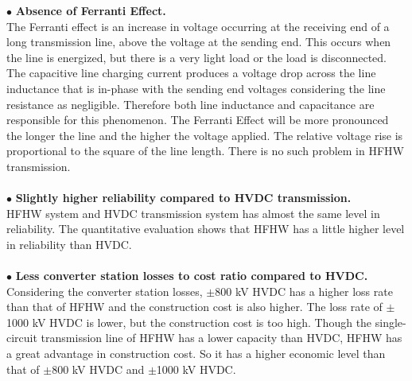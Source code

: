 \documentclass[12pt,a4paper]{reportmod}
\begin{document}
\space\space $\bullet$ \textbf{Absence of Ferranti Effect.}\\
The Ferranti effect is an increase in voltage occurring at the receiving end of a long transmission line, above the voltage at the sending end. This occurs when the line is energized, but there is a very light load or the load is disconnected. The capacitive line charging current produces a voltage drop across the line inductance that is in-phase with the sending end voltages considering the line resistance as negligible. Therefore both line inductance and capacitance are responsible for this phenomenon. The Ferranti Effect will be more pronounced the longer the line and the higher the voltage applied. The relative voltage rise is proportional to the square of the line length. There is no such problem in HFHW transmission.\\~\\
\space\space $\bullet$ \textbf{Slightly higher reliability compared to HVDC transmission.}\\
HFHW system and HVDC transmission system has almost the same level in reliability. The quantitative evaluation shows that HFHW has a little higher level in reliability than HVDC.\\~\\
\space\space $\bullet$ \textbf{Less converter station losses to cost ratio compared to HVDC.}\\
Considering the converter station losses, $\pm$800 kV HVDC has a higher loss rate than that of HFHW and the construction cost is also higher. The loss rate of $\pm$1000 kV HVDC is lower, but the construction cost is too high. Though the single-circuit transmission line of HFHW has a lower capacity than HVDC, HFHW has a great advantage in construction cost. So it has a higher economic level than that of $\pm$800 kV HVDC and $\pm$1000 kV HVDC.
\end{document}
